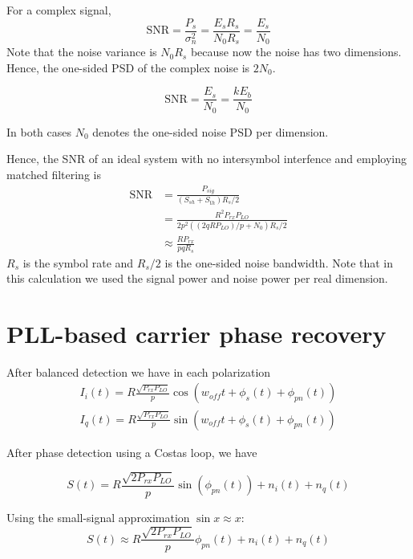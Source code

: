 \documentclass[a4paper]{article}
\begin{document}
For a complex signal, 
\begin{equation}
\mathrm{SNR} = \frac{P_s}{\sigma_n^2} = \frac{E_sR_s}{N_0R_s} = \frac{E_s}{N_0}
\end{equation}
Note that the noise variance is $N_0R_s$ because now the noise has two dimensions. Hence, the one-sided PSD of the complex noise is $2N_0$.

\begin{equation}
\mathrm{SNR} = \frac{E_s}{N_0} = \frac{kE_b}{N_0}
\end{equation}

In both cases $N_0$ denotes the one-sided noise PSD per dimension. 

Hence, the SNR of an ideal system with no intersymbol interfence and employing matched filtering is 
\begin{align} \nonumber
\mathrm{SNR} & = \frac{P_{sig}}{(S_{sh} + S_{th})R_s/2} \\ \nonumber
&= \frac{R^2P_{rx}P_{LO}}{2p^2((2qRP_{LO})/p + N_0)R_s/2} \\
&\approx \frac{RP_{rx}}{pqR_s} 
\end{align}
$R_s$ is the symbol rate and $R_s/2$ is the one-sided noise bandwidth. Note that in this calculation we used the signal power and noise power per real dimension.

\section{PLL-based carrier phase recovery}

After balanced detection we have in each polarization
\begin{align}
I_i(t) = R\frac{\sqrt{P_{rx}P_{LO}}}{p}\cos(w_{off}t + \phi_s(t) + \phi_{pn}(t)) \\
I_q(t) =  R\frac{\sqrt{P_{rx}P_{LO}}}{p}\sin(w_{off}t + \phi_s(t) + \phi_{pn}(t))
\end{align}

After phase detection using a Costas loop, we have

\begin{equation}
S(t) = R\frac{\sqrt{2P_{rx}P_{LO}}}{p}\sin(\phi_{pn}(t)) + n_i(t) + n_q(t)
\end{equation}

Using the small-signal approximation $\sin x \approx x$:
\begin{equation}
S(t) \approx R\frac{\sqrt{2P_{rx}P_{LO}}}{p}\phi_{pn}(t) + n_i(t) + n_q(t)
\end{equation}
\end{document}
